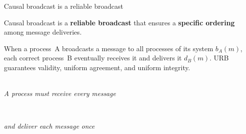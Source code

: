 \documentclass[10pt, xcolor={usenames, dvipsnames}]{beamer}
\begin{document}
\begin{frame}{Causal broadcast is a reliable broadcast}

  Causal broadcast is a \textbf{reliable broadcast} that ensures a
  \textbf{specific ordering} among message deliveries.
  
  \vspace{1em}

  \begin{definition} 
    When a process~A broadcasts a message to all processes of its system $b_A(m)$,
    each correct process~B eventually receives it and delivers it
    $d_B(m)$. URB guarantees validity, uniform agreement, and uniform integrity.
  \end{definition}

  \begin{minipage}{0.49\textwidth} %
      \\
      \small\textit{A process must receive every message}
  \end{minipage}~~~
  \begin{minipage}{0.49\textwidth} %
    \begin{center}
      
      \small\textit{and deliver each message once}
    \end{center}
  \end{minipage}
  
  

  
\end{frame}


  
\end{document}
